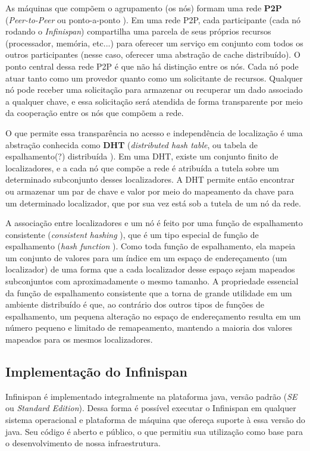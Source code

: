 \documentclass[11pt,twoside,a4paper]{book}
\begin{document}
As máquinas que compõem o agrupamento (os nós) formam uma rede \textbf{P2P} (\emph{Peer-to-Peer} ou ponto-a-ponto \cite{p2p}). Em uma rede P2P, cada participante (cada nó rodando o \emph{Infinispan}) compartilha uma parcela de seus próprios recursos (processador, memória, 
etc...) para oferecer um serviço em conjunto com todos os outros participantes (nesse caso, oferecer uma abstração de cache distribuído).
O ponto central dessa rede P2P é que não há distinção entre os nós. Cada nó pode atuar tanto como um provedor quanto como um solicitante de recursos. Qualquer nó pode receber uma solicitação para armazenar ou recuperar um dado associado a qualquer chave, e essa solicitação será atendida de forma transparente por meio da cooperação entre os nós que compõem a rede.

O que permite essa transparência no acesso e independência de localização é uma abstração conhecida como \textbf{DHT} (\emph{distributed hash table}, ou tabela de espalhamento(?) distribuída \cite{dht}). Em uma DHT, existe um conjunto finito de localizadores, e a cada nó que compõe a rede é atribuída a tutela sobre um determinado subconjunto desses localizadores. A DHT permite então encontrar ou armazenar um par de chave e valor por meio do mapeamento da chave para um determinado localizador, que por sua vez está sob a tutela de um nó da rede.

A associação entre localizadores e um nó é feito por uma função de espalhamento consistente (\emph{consistent hashing} \cite{consistent_hashing}), que é um tipo especial de função de espalhamento (\emph{hash function} \cite{taocp_3}). Como toda função de espalhamento, ela mapeia um conjunto de valores para um índice em um espaço de endereçamento (um localizador) de uma forma que a cada localizador desse espaço sejam mapeados subconjuntos com aproximadamente o mesmo tamanho. A propriedade essencial da função de espalhamento consistente que a torna de grande utilidade em um ambiente distribuído é que, ao contrário dos outros tipos de funções de espalhamento, um pequena alteração no espaço de endereçamento resulta em um número pequeno e limitado de remapeamento, mantendo a maioria dos valores mapeados para os mesmos localizadores.

\subsection{Implementação do Infinispan}
\label{sec:implementacao_infinispan}
Infinispan é implementado integralmente na plataforma java, versão padrão (\emph{SE} ou \emph{Standard Edition}). Dessa forma é possível executar o Infinispan em qualquer sistema operacional e plataforma de máquina que ofereça suporte à essa versão do java. Seu código é aberto e público, o que permitiu sua utilização como base para o desenvolvimento de nossa infraestrutura.
\end{document}
